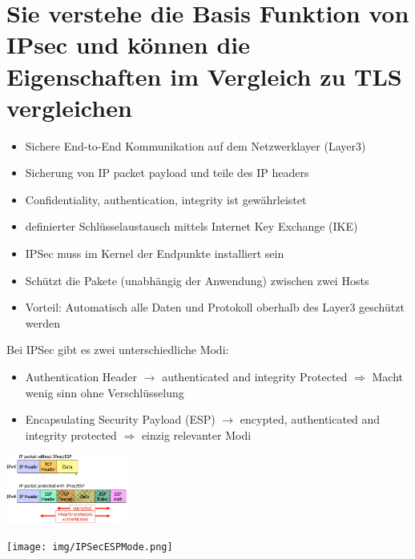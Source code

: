 \documentclass{report}
\newenvironment{Figure}
	{\par\medskip\noindent\minipage{\linewidth}}
	{\endminipage\par\medskip}
\theoremstyle{definition}
\theoremstyle{example}
\begin{document}
\section{Sie verstehe die Basis Funktion von IPsec und können die Eigenschaften im Vergleich zu TLS vergleichen}
\begin{itemize}
	\item Sichere End-to-End Kommunikation auf dem Netzwerklayer (Layer3)
	\item Sicherung von IP packet payload und teile des IP headers
	\item Confidentiality, authentication, integrity ist gewährleistet
	\item definierter Schlüsselaustausch mittels Internet Key Exchange (IKE)
	\item IPSec muss im Kernel der Endpunkte installiert sein
	\item Schützt die Pakete (unabhängig der Anwendung) zwischen zwei Hosts
	\item Vorteil: Automatisch alle Daten und Protokoll oberhalb des Layer3 geschützt werden
\end{itemize}

Bei IPSec gibt es zwei unterschiedliche Modi:
\begin{itemize}
	\item Authentication Header $\rightarrow$ authenticated and integrity Protected $\Rightarrow$ Macht wenig sinn ohne Verschlüsselung
	\item Encapsulating Security Payload (ESP) $\rightarrow$ encypted, authenticated and integrity protected $\Rightarrow$ einzig relevanter Modi
\end{itemize}

\begin{Figure}
\centering
\includegraphics[width=150px]{img/IPSecTransportMode.png}
	\label{fig:Abbildung einer IPSec mittels Transport Mode}
\end{Figure}

\begin{Figure}
\centering
\texttt{[image: img/IPSecESPMode.png]}
	\label{fig:Abbildung einer IPSec mittels ESP Mode}
\end{Figure}
\end{document}
